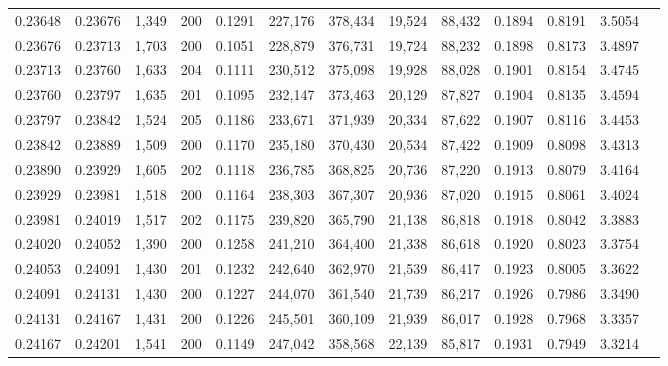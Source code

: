 \begin{tabular}{rrrrrrrrrrrrr}
0.23648 & 0.23676 & 1,349 & 200 &                                     0.1291 & 227,176 & 378,434 &  19,524 &  88,432 & 0.1894 & 0.8191 & 3.5054 \\
0.23676 & 0.23713 & 1,703 & 200 &                                     0.1051 & 228,879 & 376,731 &  19,724 &  88,232 & 0.1898 & 0.8173 & 3.4897 \\
0.23713 & 0.23760 & 1,633 & 204 &                                     0.1111 & 230,512 & 375,098 &  19,928 &  88,028 & 0.1901 & 0.8154 & 3.4745 \\
0.23760 & 0.23797 & 1,635 & 201 &                                     0.1095 & 232,147 & 373,463 &  20,129 &  87,827 & 0.1904 & 0.8135 & 3.4594 \\
0.23797 & 0.23842 & 1,524 & 205 &                                     0.1186 & 233,671 & 371,939 &  20,334 &  87,622 & 0.1907 & 0.8116 & 3.4453 \\
0.23842 & 0.23889 & 1,509 & 200 &                                     0.1170 & 235,180 & 370,430 &  20,534 &  87,422 & 0.1909 & 0.8098 & 3.4313 \\
0.23890 & 0.23929 & 1,605 & 202 &                                     0.1118 & 236,785 & 368,825 &  20,736 &  87,220 & 0.1913 & 0.8079 & 3.4164 \\
0.23929 & 0.23981 & 1,518 & 200 &                                     0.1164 & 238,303 & 367,307 &  20,936 &  87,020 & 0.1915 & 0.8061 & 3.4024 \\
0.23981 & 0.24019 & 1,517 & 202 &                                     0.1175 & 239,820 & 365,790 &  21,138 &  86,818 & 0.1918 & 0.8042 & 3.3883 \\
0.24020 & 0.24052 & 1,390 & 200 &                                     0.1258 & 241,210 & 364,400 &  21,338 &  86,618 & 0.1920 & 0.8023 & 3.3754 \\
0.24053 & 0.24091 & 1,430 & 201 &                                     0.1232 & 242,640 & 362,970 &  21,539 &  86,417 & 0.1923 & 0.8005 & 3.3622 \\
0.24091 & 0.24131 & 1,430 & 200 &                                     0.1227 & 244,070 & 361,540 &  21,739 &  86,217 & 0.1926 & 0.7986 & 3.3490 \\
0.24131 & 0.24167 & 1,431 & 200 &                                     0.1226 & 245,501 & 360,109 &  21,939 &  86,017 & 0.1928 & 0.7968 & 3.3357 \\
0.24167 & 0.24201 & 1,541 & 200 &                                     0.1149 & 247,042 & 358,568 &  22,139 &  85,817 & 0.1931 & 0.7949 & 3.3214 \\

\end{tabular}
